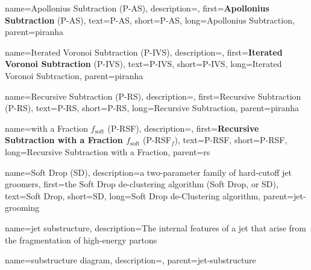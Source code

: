     {
        name=Apollonius Subtraction (P-AS),
        description={},
        first={\textbf{Apollonius Subtraction} (P-AS)},
        text={P-AS},
        short={P-AS},
        long={Apollonius Subtraction},
        parent=piranha
    }

    {
        name=Iterated Voronoi Subtraction (P-IVS),
        description={},
        first={\textbf{Iterated Voronoi Subtraction} (P-IVS)},
        text={P-IVS},
        short={P-IVS},
        long={Iterated Voronoi Subtraction},
        parent=piranha
    }

    {
        name=Recursive Subtraction (P-RS),
        description={},
        first={Recursive Subtraction (P-RS)},
        text={P-RS},
        short={P-RS},
        long={Recursive Subtraction},
        parent=piranha
    }

    {
        name=with a Fraction \(f_\text{soft}\) (P-RSF),
        description={},
        first={\textbf{Recursive Subtraction with a Fraction \(f_\text{soft}\)} (P-RSF\(_f\))},
        text={P-RSF},
        short={P-RSF},
        long={Recursive Subtraction with a Fraction},
        parent=rs
    }


    {
        name=Soft Drop (SD),
        description={a two-parameter family of hard-cutoff jet groomers},
        first={the Soft Drop de-clustering algorithm (Soft Drop, or SD)},
        text={Soft Drop},
        short={SD},
        long={Soft Drop de-Clustering algorithm},
        parent=jet-grooming
    }



{
  name=jet substructure,
  description={The internal features of a jet that arise from the fragmentation of high-energy partons}
}

    {
      name=substructure diagram,
      description={},
      parent=jet-substructure
    }






